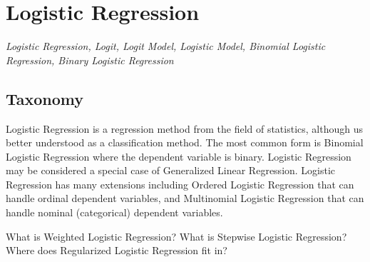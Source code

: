 
\section{Logistic Regression} 
\label{sec:logistic}

\emph{Logistic Regression, Logit, Logit Model, Logistic Model, Binomial Logistic Regression, Binary Logistic Regression}

\subsection{Taxonomy}
Logistic Regression is a regression method from the field of statistics, although us better understood as a classification method.
The most common form is Binomial Logistic Regression where the dependent variable is binary.
Logistic Regression may be considered a special case of Generalized Linear Regression.
Logistic Regression has many extensions including Ordered Logistic Regression that can handle ordinal dependent variables, and Multinomial Logistic Regression that can handle nominal (categorical) dependent variables.

What is Weighted Logistic Regression?
What is Stepwise Logistic Regression?
Where does Regularized Logistic Regression fit in?

